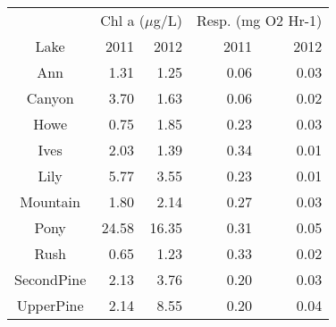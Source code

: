 \begin{table}[ht]
\centering
\begin{tabular}{crrrr}
  \hline
  & \multicolumn{2}{c}{Chl a ($\mu$g/L)} & 
                      \multicolumn{2}{c}{Resp. (mg O2 Hr-1)} \\
 Lake & 2011 & 2012 & 2011 & 2012 \\
 \hline
Ann & 1.31 & 1.25 & 0.06 & 0.03 \\ 
  Canyon & 3.70 & 1.63 & 0.06 & 0.02 \\ 
  Howe & 0.75 & 1.85 & 0.23 & 0.03 \\ 
  Ives & 2.03 & 1.39 & 0.34 & 0.01 \\ 
  Lily & 5.77 & 3.55 & 0.23 & 0.01 \\ 
  Mountain & 1.80 & 2.14 & 0.27 & 0.03 \\ 
  Pony & 24.58 & 16.35 & 0.31 & 0.05 \\ 
  Rush & 0.65 & 1.23 & 0.33 & 0.02 \\ 
  SecondPine & 2.13 & 3.76 & 0.20 & 0.03 \\ 
  UpperPine & 2.14 & 8.55 & 0.20 & 0.04 \\ 
   \hline
\end{tabular}
\end{table}
